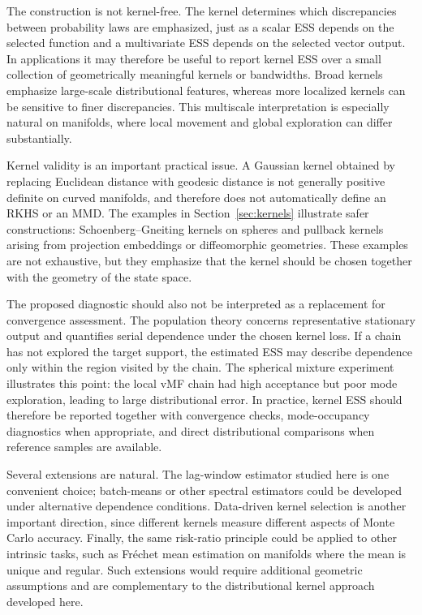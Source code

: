 \documentclass[11pt]{article}
\newcommand{\1}{\mathbf{1}}
\begin{document}
The construction is not kernel-free.  The kernel determines which discrepancies between probability laws are emphasized, just as a scalar ESS depends on the selected function and a multivariate ESS depends on the selected vector output.  In applications it may therefore be useful to report kernel ESS over a small collection of geometrically meaningful kernels or bandwidths.  Broad kernels emphasize large-scale distributional features, whereas more localized kernels can be sensitive to finer discrepancies.  This multiscale interpretation is especially natural on manifolds, where local movement and global exploration can differ substantially.

Kernel validity is an important practical issue.  A Gaussian kernel obtained by replacing Euclidean distance with geodesic distance is not generally positive definite on curved manifolds, and therefore does not automatically define an RKHS or an MMD.  The examples in Section~\ref{sec:kernels} illustrate safer constructions: Schoenberg--Gneiting kernels on spheres and pullback kernels arising from projection embeddings or diffeomorphic geometries.  These examples are not exhaustive, but they emphasize that the kernel should be chosen together with the geometry of the state space.

The proposed diagnostic should also not be interpreted as a replacement for convergence assessment.  The population theory concerns representative stationary output and quantifies serial dependence under the chosen kernel loss.  If a chain has not explored the target support, the estimated ESS may describe dependence only within the region visited by the chain.  The spherical mixture experiment illustrates this point: the local vMF chain had high acceptance but poor mode exploration, leading to large distributional error.  In practice, kernel ESS should therefore be reported together with convergence checks, mode-occupancy diagnostics when appropriate, and direct distributional comparisons when reference samples are available.

Several extensions are natural.  The lag-window estimator studied here is one convenient choice; batch-means or other spectral estimators could be developed under alternative dependence conditions.  Data-driven kernel selection is another important direction, since different kernels measure different aspects of Monte Carlo accuracy.  Finally, the same risk-ratio principle could be applied to other intrinsic tasks, such as Fr\'echet mean estimation on manifolds where the mean is unique and regular.  Such extensions would require additional geometric assumptions and are complementary to the distributional kernel approach developed here.
\end{document}
